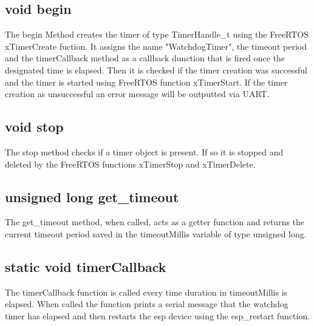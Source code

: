 \subsection{void begin}
\label{subsec:Watchdog_begin}
The begin Method creates the timer of type TimerHandle\_t using the FreeRTOS xTimerCreate fuction. 
It assigns the name "WatchdogTimer", the timeout period and the timerCallback method as a callback dunction that is fired once the designated time is elapsed. 
Then it is checked if the timer creation was successful and the timer is started using FreeRTOS function xTimerStart. 
If the timer creation as unsuccessful an error message will be outputted via UART. 

\subsection{void stop}
\label{subsec:Watchdog_stop}
The stop method checks if a timer object is present. 
If so it is stopped and deleted by the FreeRTOS functions xTimerStop and xTimerDelete. 

\subsection{unsigned long get\_timeout}
\label{subsec:Watchdog_get_timeout}
The get\_timeout method, when called, acts as a getter function and returns the current timeout period saved in the timeoutMillis variable of type unsigned long. 

\subsection{static void timerCallback}
\label{subsec:Watchdog_timerCallback}
The timerCallback function is called every time duration in timeoutMillis is elapsed. 
When called the function prints a serial message that the watchdog timer has elapsed and then restarts the esp device using the esp\_restart function. 
